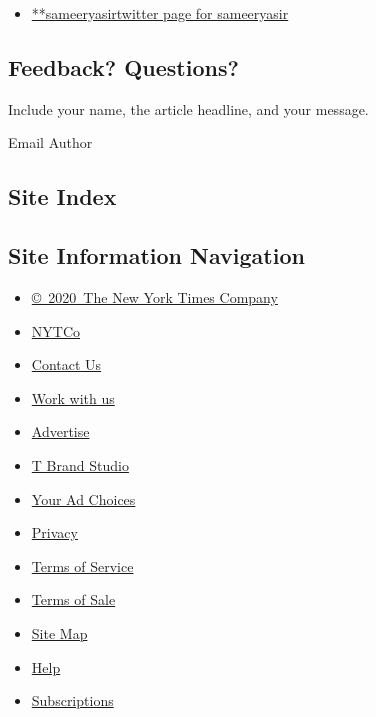 \begin{itemize}
\tightlist
\item
  \href{https://twitter.com/sameeryasir}{**sameeryasirtwitter page for
  sameeryasir}
\end{itemize}

\hypertarget{feedback-questions}{%
\subsection{Feedback? Questions?}\label{feedback-questions}}

Include your name, the article headline, and your message.

Email Author

\hypertarget{site-index}{%
\subsection{Site Index}\label{site-index}}

\hypertarget{site-information-navigation}{%
\subsection{Site Information
Navigation}\label{site-information-navigation}}

\begin{itemize}
\tightlist
\item
  \href{https://help.nytimes3xbfgragh.onion/hc/en-us/articles/115014792127-Copyright-notice}{©~2020~The
  New York Times Company}
\end{itemize}

\begin{itemize}
\tightlist
\item
  \href{https://www.nytco.com/}{NYTCo}
\item
  \href{https://help.nytimes3xbfgragh.onion/hc/en-us/articles/115015385887-Contact-Us}{Contact
  Us}
\item
  \href{https://www.nytco.com/careers/}{Work with us}
\item
  \href{https://nytmediakit.com/}{Advertise}
\item
  \href{http://www.tbrandstudio.com/}{T Brand Studio}
\item
  \href{https://www.nytimes3xbfgragh.onion/privacy/cookie-policy\#how-do-i-manage-trackers}{Your
  Ad Choices}
\item
  \href{https://www.nytimes3xbfgragh.onion/privacy}{Privacy}
\item
  \href{https://help.nytimes3xbfgragh.onion/hc/en-us/articles/115014893428-Terms-of-service}{Terms
  of Service}
\item
  \href{https://help.nytimes3xbfgragh.onion/hc/en-us/articles/115014893968-Terms-of-sale}{Terms
  of Sale}
\item
  \href{https://spiderbites.nytimes3xbfgragh.onion}{Site Map}
\item
  \href{https://help.nytimes3xbfgragh.onion/hc/en-us}{Help}
\item
  \href{https://www.nytimes3xbfgragh.onion/subscription?campaignId=37WXW}{Subscriptions}
\end{itemize}
